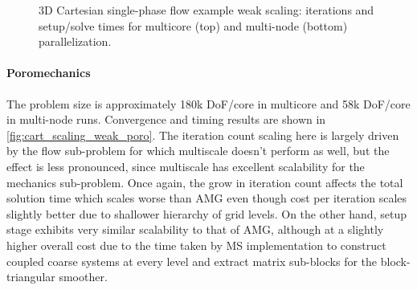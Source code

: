 \begin{figure} [htbp]
  \begin{subfigure}[t]{0.48\textwidth}
    \centering
    
  \end{subfigure}
  \hfill
   \begin{subfigure}[t]{0.48\textwidth}
    \centering
    
  \end{subfigure}
  \begin{subfigure}[t]{0.48\textwidth}
    \centering
    
  \end{subfigure}
  \hfill
  \begin{subfigure}[t]{0.48\textwidth}
    \centering
    
  \end{subfigure}
  \caption[3D Cartesian single-phase flow example weak scaling]{3D Cartesian single-phase flow example weak scaling: iterations and setup/solve times for multicore (top) and multi-node (bottom) parallelization.}
  \label{fig:cart_scaling_weak_flow}
\end{figure}

\paragraph{Poromechanics}
The problem size is approximately 180k DoF/core in multicore and 58k DoF/core in multi-node runs.   Convergence and timing results are shown in \cref{fig:cart_scaling_weak_poro}.   The iteration count scaling here is largely driven by the flow sub-problem for which multiscale doesn't perform as well, but the effect is less pronounced, since multiscale has excellent scalability for the mechanics sub-problem.   Once again, the grow in iteration count affects the total solution time which scales worse than AMG even though cost per iteration scales slightly better due to shallower hierarchy of grid levels.   On the other hand, setup stage exhibits very similar scalability to that of AMG, although at a slightly higher overall cost due to the time taken by MS implementation to construct coupled coarse systems at every level and extract matrix sub-blocks for the block-triangular smoother.

